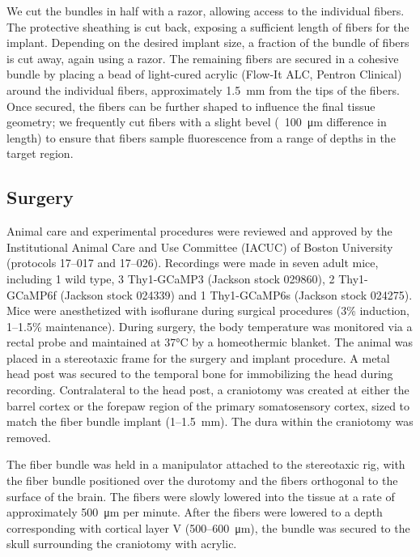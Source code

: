 We cut the bundles in half with a razor, allowing access to the 
individual fibers. The protective sheathing is cut back, exposing a 
sufficient length of fibers for the implant. Depending on the desired 
implant size, a fraction of the bundle of fibers is cut away, again 
using a razor. The remaining fibers are secured in a cohesive bundle 
by placing a bead of light-cured acrylic (Flow-It ALC, Pentron 
Clinical) around the individual fibers, approximately 
1.5~\si{\milli\meter} from the tips of the fibers. Once secured, the 
fibers can be further shaped to influence the final tissue geometry; 
we frequently cut fibers with a slight bevel (~100~\si{\micro\meter} 
difference in length) to ensure that fibers sample fluorescence from a
 range of depths in the target region.

\subsection{Surgery}

Animal care and experimental procedures were reviewed and approved by 
the Institutional Animal Care and Use Committee (IACUC) of Boston 
University (protocols 17--017 and 17--026). Recordings were made in 
seven adult mice, including 1 wild type, 3 Thy1-GCaMP3 (Jackson stock 
029860), 2 Thy1-GCaMP6f (Jackson stock 024339) and 1 Thy1-GCaMP6s 
(Jackson stock 024275). Mice were anesthetized with isoflurane during 
surgical procedures (3\% induction, 1--1.5\% maintenance). During 
surgery, the body temperature was monitored via a rectal probe and 
maintained at 37\si{\celsius} by a homeothermic blanket. The animal 
was placed in a stereotaxic frame for the surgery and implant 
procedure. A metal head post was secured to the temporal bone for 
immobilizing the head during recording. Contralateral to the head 
post, a craniotomy was created at either the barrel cortex or the forepaw region 
of the primary somatosensory cortex, sized to match the fiber bundle 
implant (1--1.5~\si{\milli\meter}). The dura within the craniotomy was
 removed.



The fiber bundle was held in a manipulator attached to the stereotaxic
 rig, with the fiber bundle positioned over the durotomy and the 
fibers orthogonal to the surface of the brain. The fibers were slowly 
lowered into the tissue at a rate of approximately 
500~\si{\micro\meter} per minute. After the fibers were lowered to a 
depth corresponding with cortical layer V (500--600~\si{\micro\meter}), 
the bundle was secured to the skull surrounding the craniotomy with 
acrylic.

